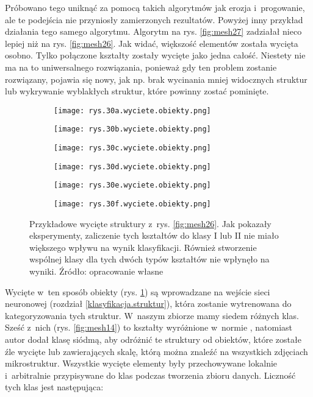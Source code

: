 Próbowano tego uniknąć za pomocą takich algorytmów jak erozja i~progowanie, ale te podejścia nie przyniosły zamierzonych rezultatów. Powyżej inny przykład działania tego samego algorytmu.
Algorytm na rys. \ref{fig:mesh27} zadziałał nieco lepiej niż na rys. \ref{fig:mesh26}. Jak widać, większość elementów została wycięta osobno. Tylko połączone kształty zostały wycięte jako jedna całość. Niestety nie ma na to uniwersalnego rozwiązania, ponieważ gdy ten problem zostanie rozwiązany, pojawia się nowy, jak np. brak wycinania mniej widocznych struktur lub wykrywanie wyblakłych struktur, które powinny zostać pominięte.
\begin{figure}[h]
	\centering
	\begin{subfigure}{0.29\textwidth}
	    \centering
	    \texttt{[image: rys.30a.wyciete.obiekty.png]}
	\end{subfigure}
	\begin{subfigure}{0.29\textwidth}
	    \centering
	    \texttt{[image: rys.30b.wyciete.obiekty.png]}
	\end{subfigure}
	\begin{subfigure}{0.29\textwidth}
	    \centering
	    \texttt{[image: rys.30c.wyciete.obiekty.png]}
	\end{subfigure}
	\begin{subfigure}{0.29\textwidth}
	    \centering
	    \texttt{[image: rys.30d.wyciete.obiekty.png]}
	\end{subfigure}
	\begin{subfigure}{0.29\textwidth}
	    \centering
	    \texttt{[image: rys.30e.wyciete.obiekty.png]}
	\end{subfigure}
	\begin{subfigure}{0.29\textwidth}
	    \centering
	    \texttt{[image: rys.30f.wyciete.obiekty.png]}
	\end{subfigure}
	\caption{\label{fig:mesh28}Przykładowe wycięte struktury z~rys. \ref{fig:mesh26}. Jak pokazały eksperymenty, zaliczenie tych kształtów do klasy I lub II nie miało większego wpływu na wynik klasyfikacji. Również stworzenie wspólnej klasy dla tych dwóch typów kształtów nie wpłynęło na wyniki. Źródło: opracowanie własne}
\end{figure}
Wycięte w~ten sposób obiekty (rys. \ref{fig:mesh28}) są wprowadzane na wejście sieci neuronowej (rozdział \ref{klasyfikacja.struktur}), która zostanie wytrenowana do kategoryzowania tych struktur. W~naszym zbiorze mamy siedem różnych klas. Sześć z~nich (rys. \ref{fig:mesh14}) to kształty wyróżnione w~normie \cite{norma}, natomiast autor dodał klasę siódmą, aby odróżnić te struktury od obiektów, które zostałe źle wycięte lub zawierających skalę, którą można znaleźć na wszystkich zdjęciach mikrostruktur. Wszystkie wycięte elementy były przechowywane lokalnie i~arbitralnie przypisywane do klas podczas tworzenia zbioru danych. Liczność tych klas jest następująca:
